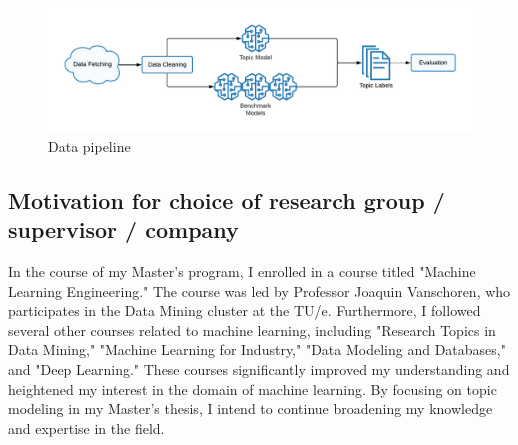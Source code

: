 \documentclass{article}
\begin{document}
\begin{figure}[h] %
    \centering
    \includegraphics[width=\textwidth]{images/data_pipeline.pdf}
    \caption{Data pipeline}
    \label{fig:data_pipeline}
\end{figure}




\subsection{Motivation for choice of research group / supervisor / company}


In the course of my Master's program, I enrolled in a course titled "Machine Learning Engineering." The course was led by Professor Joaquin Vanschoren, who participates in the Data Mining cluster at the TU/e. Furthermore, I followed several other courses related to machine learning, including "Research Topics in Data Mining," "Machine Learning for Industry," "Data Modeling and Databases," and "Deep Learning." These courses significantly improved my understanding and heightened my interest in the domain of machine learning. By focusing on topic modeling in my Master's thesis, I intend to continue broadening my knowledge and expertise in the field.
\end{document}
